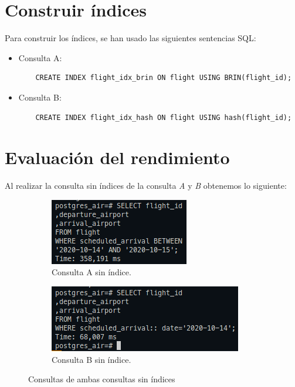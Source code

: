 \documentclass[11pt]{report}
\begin{document}
\section{Construir índices}
Para construir los índices, se han usado las siguientes sentencias SQL:
\begin{itemize}
  \item Consulta A:
  \begin{verbatim}
    CREATE INDEX flight_idx_brin ON flight USING BRIN(flight_id);
  \end{verbatim}
  \item Consulta B:
  \begin{verbatim}
    CREATE INDEX flight_idx_hash ON flight USING hash(flight_id);
  \end{verbatim}
\end{itemize}

\section{Evaluación del rendimiento}
Al realizar la consulta sin índices de la consulta \emph{A} y \emph{B} obtenemos lo siguiente:
\begin{figure}[H]
  \begin{subfigure}{0.5\textwidth}
    \centering
    \includegraphics[scale=0.7]{img/consulta_A_sin_indice.png}
    \caption{Consulta A sin índice.}
  \end{subfigure}%
  \begin{subfigure}{0.5\textwidth}
    \centering
    \includegraphics[scale=0.7]{img/consulta_b_sin_indice.png}
    \caption{Consulta B sin índice.}
  \end{subfigure}
  \caption{Consultas de ambas consultas sin índices}
\end{figure}
\end{document}

